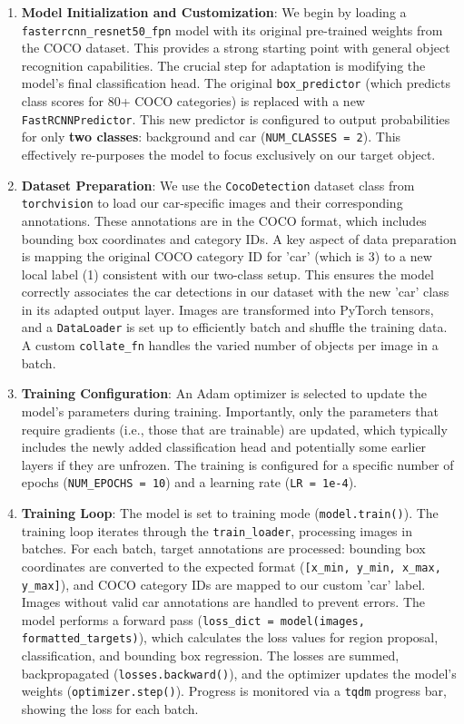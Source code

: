 \documentclass[conference]{IEEEtran}
\begin{document}
\begin{enumerate}
    \item \textbf{Model Initialization and Customization}:
    We begin by loading a \texttt{fasterrcnn\_resnet50\_fpn} model with its original pre-trained weights from the COCO dataset. This provides a strong starting point with general object recognition capabilities. The crucial step for adaptation is modifying the model's final classification head. The original \texttt{box\_predictor} (which predicts class scores for 80+ COCO categories) is replaced with a new \texttt{FastRCNNPredictor}. This new predictor is configured to output probabilities for only \textbf{two classes}: background and car (\texttt{NUM\_CLASSES = 2}). This effectively re-purposes the model to focus exclusively on our target object.

    \item \textbf{Dataset Preparation}:
    We use the \texttt{CocoDetection} dataset class from \texttt{torchvision} to load our car-specific images and their corresponding annotations. These annotations are in the COCO format, which includes bounding box coordinates and category IDs. A key aspect of data preparation is mapping the original COCO category ID for 'car' (which is 3) to a new local label (1) consistent with our two-class setup. This ensures the model correctly associates the car detections in our dataset with the new 'car' class in its adapted output layer. Images are transformed into PyTorch tensors, and a \texttt{DataLoader} is set up to efficiently batch and shuffle the training data. A custom \texttt{collate\_fn} handles the varied number of objects per image in a batch.

    \item \textbf{Training Configuration}:
    An Adam optimizer is selected to update the model's parameters during training. Importantly, only the parameters that require gradients (i.e., those that are trainable) are updated, which typically includes the newly added classification head and potentially some earlier layers if they are unfrozen. The training is configured for a specific number of epochs (\texttt{NUM\_EPOCHS = 10}) and a learning rate (\texttt{LR = 1e-4}).

    \item \textbf{Training Loop}:
    The model is set to training mode (\texttt{model.train()}). The training loop iterates through the \texttt{train\_loader}, processing images in batches. For each batch, target annotations are processed: bounding box coordinates are converted to the expected format (\texttt{[x\_min, y\_min, x\_max, y\_max]}), and COCO category IDs are mapped to our custom 'car' label. Images without valid car annotations are handled to prevent errors. The model performs a forward pass (\texttt{loss\_dict = model(images, formatted\_targets)}), which calculates the loss values for region proposal, classification, and bounding box regression. The losses are summed, backpropagated (\texttt{losses.backward()}), and the optimizer updates the model's weights (\texttt{optimizer.step()}). Progress is monitored via a \texttt{tqdm} progress bar, showing the loss for each batch.
\end{enumerate}
\end{document}
